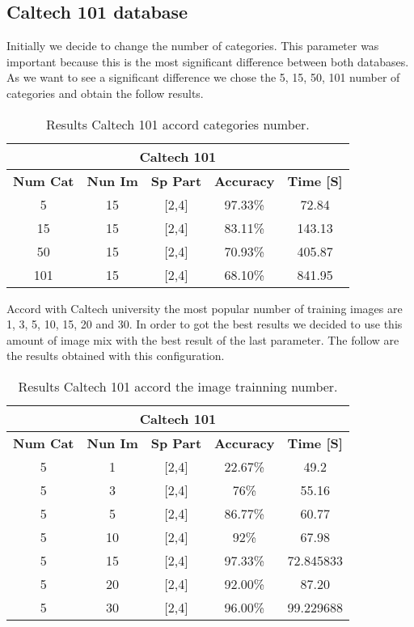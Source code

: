 \documentclass[10pt,twocolumn,letterpaper]{article}
\begin{document}
\subsection{ Caltech 101 database}

Initially we decide to change the number of categories. This parameter was important because this is the most significant difference between both databases. As we want to see a significant difference we chose the 5, 15, 50, 101 number of categories and obtain the follow results.

\begin{table}[H]
\centering
\caption{Results Caltech 101 accord categories number.}
\label{tabla:final}
\begin{tabular}{|c|c| c| c| c|}
\hline
\multicolumn{5}{|c|}{\textbf{Caltech 101}} \\
\hline 
\cline{1-5}
\textbf {Num Cat} & \textbf { Nun Im}&\textbf { Sp Part} & \textbf {Accuracy} & \textbf { Time [S]}\\
\cline{1-5}
5 & 15 & [2,4] & 97.33\% & 72.84 \\
\cline{1-5}
15 & 15 & [2,4] & 83.11\% & 143.13 \\
\cline{1-5}
50 & 15 & [2,4] & 70.93\% & 405.87 \\
\cline{1-5}
101 & 15 & [2,4] & 68.10\% & 841.95 \\
\hline
\end{tabular}

\end{table}

Accord with Caltech university \cite{1} the most popular number of training images are 1, 3, 5, 10, 15, 20 and 30. In order to got the best results we decided to use this amount of image mix with the best result of the last parameter. The follow are the results obtained with this configuration.


\begin{table}[H]
\centering
\caption{Results Caltech 101 accord the image trainning number.}
\label{tabla:final}
\begin{tabular}{|c|c| c| c| c|}
\hline
\multicolumn{5}{|c|}{\textbf{Caltech 101}} \\
\hline 
\cline{1-5}
\textbf {Num Cat} & \textbf { Nun Im}&\textbf { Sp Part} & \textbf {Accuracy} & \textbf { Time [S]}\\
\cline{1-5}
5 & 1 & [2,4] & 22.67\% & 49.2 \\
\cline{1-5}
5 & 3 & [2,4] & 76\% & 55.16 \\
\cline{1-5}
5 & 5 & [2,4] & 86.77\% & 60.77 \\
\cline{1-5}
5 & 10 & [2,4] & 92\% & 67.98 \\
\cline{1-5}
5 & 15 & [2,4] & 97.33\% & 72.845833 \\
\cline{1-5}
5 & 20 & [2,4] & 92.00\% & 87.20 \\
\cline{1-5}
5 & 30 & [2,4] & 96.00\% & 99.229688 \\
\hline
\end{tabular}
\end{table}
\end{document}
